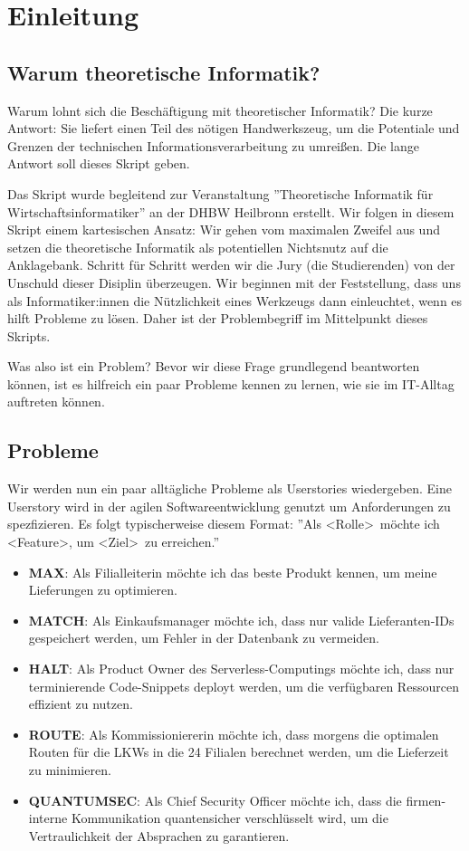 \chapter{Einleitung}
\section{Warum theoretische Informatik?}
Warum lohnt sich die Beschäftigung mit theoretischer Informatik?
Die kurze Antwort: Sie liefert einen Teil des nötigen Handwerkszeug,
um die Potentiale und Grenzen der technischen Informationsverarbeitung zu umreißen.
Die lange Antwort soll dieses Skript geben.

Das Skript wurde begleitend zur Veranstaltung ''Theoretische Informatik für Wirtschaftsinformatiker''
an der DHBW Heilbronn erstellt.
Wir folgen in diesem Skript einem kartesischen Ansatz:
Wir gehen vom maximalen Zweifel aus und setzen die theoretische Informatik
als potentiellen Nichtsnutz auf die Anklagebank.
Schritt für Schritt werden wir die Jury (die Studierenden) von der Unschuld dieser
Disiplin überzeugen.
Wir beginnen mit der Feststellung, dass uns als Informatiker:innen die Nützlichkeit
eines Werkzeugs dann einleuchtet, wenn es hilft Probleme zu lösen.
Daher ist der Problembegriff im Mittelpunkt dieses Skripts.

Was also ist ein Problem?
Bevor wir diese Frage grundlegend beantworten können,
ist es hilfreich ein paar Probleme kennen zu lernen,
wie sie im IT-Alltag auftreten können.

\section{Probleme}
Wir werden nun ein paar alltägliche Probleme als Userstories wiedergeben.
Eine Userstory wird in der agilen Softwareentwicklung genutzt um Anforderungen zu spezfizieren.
Es folgt typischerweise diesem Format:
''Als \textless Rolle\textgreater\ möchte ich \textless Feature\textgreater,
um \textless Ziel\textgreater\ zu erreichen.''

\begin{itemize}
    \item \textbf{MAX}: Als Filialleiterin möchte ich das beste Produkt kennen,
        um meine Lieferungen zu optimieren.
    \item \textbf{MATCH}: Als Einkaufsmanager möchte ich,
        dass nur valide Lieferanten-IDs gespeichert werden,
        um Fehler in der Datenbank zu vermeiden.
    \item \textbf{HALT}: Als Product Owner des Serverless-Computings möchte ich,
        dass nur terminierende Code-Snippets deployt werden,
        um die verfügbaren Ressourcen effizient zu nutzen.
    \item \textbf{ROUTE}: Als Kommissioniererin möchte ich,
        dass morgens die optimalen Routen für die LKWs in die 24 Filialen berechnet werden,
        um die Lieferzeit zu minimieren.
    \item \textbf{QUANTUMSEC}: Als Chief Security Officer möchte ich,
        dass die firmen-interne Kommunikation quantensicher verschlüsselt wird,
        um die Vertraulichkeit der Absprachen zu garantieren.
\end{itemize}

